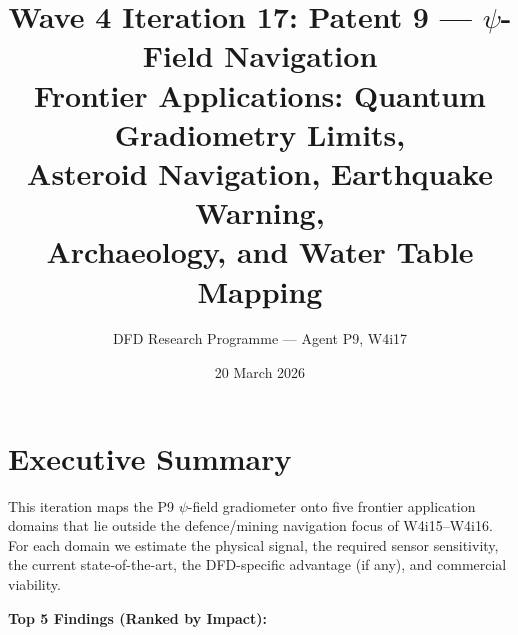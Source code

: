 \documentclass[11pt]{article}
\title{\textbf{Wave 4 Iteration 17: Patent 9 --- $\psi$-Field Navigation}\\[6pt]
Frontier Applications: Quantum Gradiometry Limits,\\
Asteroid Navigation, Earthquake Warning,\\
Archaeology, and Water Table Mapping}
\author{DFD Research Programme --- Agent P9, W4i17}
\date{20 March 2026}
\theoremstyle{definition}
\theoremstyle{remark}
\begin{document}
\maketitle
\tableofcontents
\newpage

\section*{Executive Summary}

This iteration maps the P9 $\psi$-field gradiometer onto five frontier
application domains that lie outside the defence/mining navigation focus of
W4i15--W4i16. For each domain we estimate the physical signal, the required
sensor sensitivity, the current state-of-the-art, the DFD-specific advantage
(if any), and commercial viability.

\textbf{Top 5 Findings (Ranked by Impact):}
\end{document}
